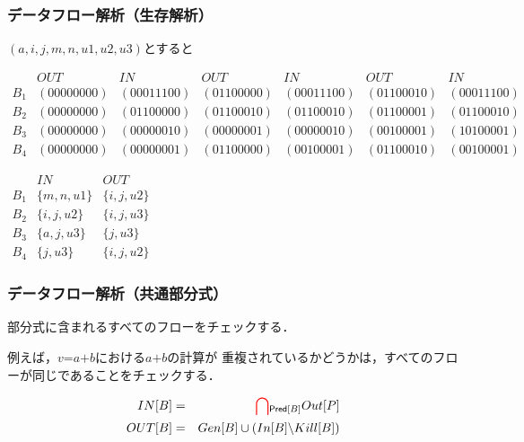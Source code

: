 \documentclass[dvipdfmx]{beamer}
\begin{document}
\begin{frame}
  \frametitle{データフロー解析（生存解析）}
  $(a,i,j,m,n,u1,u2,u3)$とすると

  {\scriptsize
    $\begin{array}{l|llllll}
            & OUT        & IN         & OUT        & IN         & OUT        & IN         \\\hline
        B_1 & (00000000) & (00011100) & (01100000) & (00011100) & (01100010) & (00011100) \\
        B_2 & (00000000) & (01100000) & (01100010) & (01100010) & (01100001) & (01100010) \\
        B_3 & (00000000) & (00000010) & (00000001) & (00000010) & (00100001) & (10100001) \\
        B_4 & (00000000) & (00000001) & (01100000) & (00100001) & (01100010) & (00100001)
      \end{array}$}

  \vspace*{10pt}


  \vspace*{10pt}

  $\begin{array}{l|ll}
          & IN         & OUT        \\\hline
      B_1 & \{m,n,u1\} & \{i,j,u2\} \\
      B_2 & \{i,j,u2\} & \{i,j,u3\} \\
      B_3 & \{a,j,u3\} & \{j,u3\}   \\
      B_4 & \{j,u3\}   & \{i,j,u2\}
    \end{array}$
\end{frame}

\begin{frame}
  \frametitle{データフロー解析（共通部分式）}

  部分式に含まれるすべてのフローをチェックする．

  例えば，$v\texttt{=}a\texttt{+}b$における$a\texttt{+}b$の計算が
  重複されているかどうかは，すべてのフローが同じであることをチェックする．

  \begin{eqnarray}
    IN[B] & = & {\color{red}\bigcap}_{\mathsf{Pred}[B]}Out[P]\\
    OUT[B] & = & Gen[B]\cup(In[B]\backslash Kill[B])
  \end{eqnarray}

\end{frame}
\end{document}
